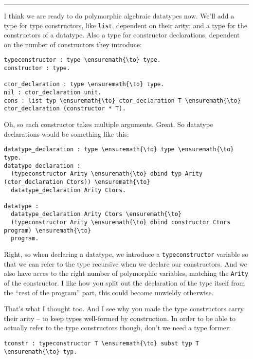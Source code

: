 \begin{center}\rule{0.5\linewidth}{\linethickness}\end{center}

\heroADVISOR{} I think we are ready to do polymorphic algebraic datatypes now.
We'll add a type for type constructors, like \texttt{list}, dependent on
their arity; and a type for the constructors of a datatype. Also a type
for constructor declarations, dependent on the number of constructors
they introduce:

\begin{verbatim}
typeconstructor : type \ensuremath{\to} type.
constructor : type.

ctor_declaration : type \ensuremath{\to} type.
nil : ctor_declaration unit.
cons : list typ \ensuremath{\to} ctor_declaration T \ensuremath{\to} ctor_declaration (constructor * T).
\end{verbatim}

\heroSTUDENT{} Oh, so each constructor takes multiple arguments. Great. So
datatype declarations would be something like this:

\begin{verbatim}
datatype_declaration : type \ensuremath{\to} type \ensuremath{\to} type.
datatype_declaration : 
  (typeconstructor Arity \ensuremath{\to} dbind typ Arity (ctor_declaration Ctors)) \ensuremath{\to}
  datatype_declaration Arity Ctors.

datatype :
  datatype_declaration Arity Ctors \ensuremath{\to}
  (typeconstructor Arity \ensuremath{\to} dbind constructor Ctors program) \ensuremath{\to}
  program.
\end{verbatim}

\heroADVISOR{} Right, so when declaring a datatype, we introduce a
\texttt{typeconstructor} variable so that we can refer to the type
recursive when we declare our constructors. And we also have acces to
the right number of polymorphic variables, matching the \texttt{Arity}
of the constructor. I like how you split out the declaration of the type
itself from the ``rest of the program'' part, this could become unwieldy
otherwise.

\heroSTUDENT{} That's what I thought too. And I see why you made the type
constructors carry their arity -- to keep types well-formed by
construction. In order to be able to actually refer to the type
constructors though, don't we need a type former:

\begin{verbatim}
tconstr : typeconstructor T \ensuremath{\to} subst typ T \ensuremath{\to} typ.
\end{verbatim}


